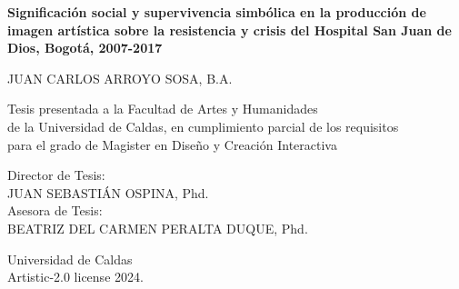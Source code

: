 \begin{titlepage}
\renewcommand*{\thepage}{Title}

    \begin{center} 
        \vspace*{3cm}
        
        {\fontsize{16pt}{22pt}\selectfont\textbf
            {Significación social y supervivencia simbólica en la producción de imagen artística sobre la resistencia y crisis del Hospital San Juan de Dios, Bogotá, 2007-2017}
        }

        \vspace{1.5cm}
        
        
        \vspace{0.5cm}
        
        	JUAN CARLOS ARROYO SOSA, B.A. \\

        \vspace{1.5cm}
        
        	Tesis presentada a la Facultad de Artes y Humanidades \\
            de la Universidad de Caldas, en cumplimiento parcial de los requisitos \\
            para el grado de Magister en Diseño y Creación Interactiva

        
        \vspace{1.5cm}
        
        Director de Tesis:\\        

        JUAN SEBASTIÁN OSPINA, Phd.\\

        Asesora de Tesis:\\        

        BEATRIZ DEL CARMEN PERALTA DUQUE, Phd.\\
        \vspace{1.5cm}
        
            Universidad de Caldas\\
            \vspace{0.5cm}
            Artistic-2.0 license 2024. 
    
    \end{center}

\end{titlepage}